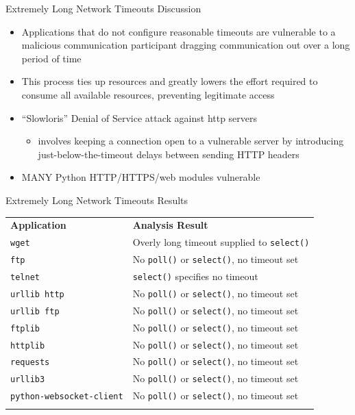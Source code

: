 \documentclass[pdf]{beamer}
\begin{document}
\begin{frame}{Extremely Long Network Timeouts Discussion}
  \begin{itemize}
    \item{Applications that do not configure reasonable timeouts are vulnerable
      to a malicious communication participant dragging communication out over a
      long period of time}
    \item{This process ties up resources and greatly lowers the effort required to
      consume all available resources, preventing legitimate access}
    \item{``Slowloris'' Denial of Service attack against http servers}
      \begin{itemize}
        \item{involves keeping a connection open to a vulnerable server by
          introducing just-below-the-timeout delays between sending HTTP headers}
      \end{itemize}
    \item{MANY Python HTTP/HTTPS/web modules vulnerable}
  \end{itemize}
\end{frame}


\begin{frame}{Extremely Long Network Timeouts Results}
\begin{table}[t]
  \scriptsize{}
  \begin{tabular}{l | l}
    \toprule{}
    {\bf Application}              & {\bf Analysis Result}\\
    {\tt wget}                     & Overly long timeout supplied to {\tt select()} \\
    {\tt ftp}                      & No {\tt poll()} or {\tt select()}, no timeout set \\
    {\tt telnet}                   & {\tt select()} specifies no timeout \\
    {\tt urllib http}              & No {\tt poll()} or {\tt select()}, no timeout set \\
    {\tt urllib ftp}               & No {\tt poll()} or {\tt select()}, no timeout set \\
    {\tt ftplib}                   & No {\tt poll()} or {\tt select()}, no timeout set \\
    {\tt httplib}                  & No {\tt poll()} or {\tt select()}, no timeout set \\
    {\tt requests}                 & No {\tt poll()} or {\tt select()}, no timeout set \\
    {\tt urllib3}                  & No {\tt poll()} or {\tt select()}, no timeout set \\
    {\tt python-websocket-client}  & No {\tt poll()} or {\tt select()}, no timeout set \\
    \bottomrule{}
  \end{tabular}
\end{table}
\end{frame}
\end{document}
